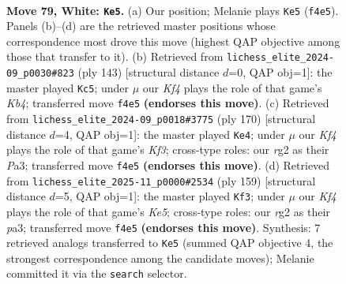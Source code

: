 \documentclass[11pt]{article}
\begin{document}
\clearpage

\begin{figure}[p]\centering
\begin{subfigure}{0.46\textwidth}\centering
\resizebox{\linewidth}{!}{%
\newchessgame
\chessboard[
  setfen={8/4k3/8/2pp4/p4K2/8/6r1/8 w - - 14 79},
  showmover=false,
  pgfstyle=straightmove, color=movearrow, markmove={f4-e5}
]}
\caption{}
\end{subfigure}\hfill
\begin{subfigure}{0.46\textwidth}\centering
\resizebox{\linewidth}{!}{%
\newchessgame
\chessboard[
  setfen={8/5P2/8/1k1P2P1/7R/3K4/8/8 b - - 0 72},
  showmover=false,
  pgfstyle=straightmove, color=movearrow, markmove={b5-c5}
]}
\caption{}
\end{subfigure}
\\[4pt]
\begin{subfigure}{0.46\textwidth}\centering
\resizebox{\linewidth}{!}{%
\newchessgame
\chessboard[
  setfen={8/p7/8/6k1/3p4/P4K2/8/8 w - - 0 86},
  showmover=false,
  pgfstyle=straightmove, color=movearrow, markmove={f3-e4}
]}
\caption{}
\end{subfigure}\hfill
\begin{subfigure}{0.46\textwidth}\centering
\resizebox{\linewidth}{!}{%
\newchessgame
\chessboard[
  setfen={8/8/8/1K6/4k1p1/P5P1/8/8 b - - 2 80},
  showmover=false,
  pgfstyle=straightmove, color=movearrow, markmove={e4-f3}
]}
\caption{}
\end{subfigure}
\caption{\textbf{Move 79, White: \texttt{Ke5}.} (a) Our position; Melanie plays \texttt{Ke5} (\texttt{f4e5}). Panels (b)--(d) are the retrieved master positions whose correspondence most drove this move (highest QAP objective among those that transfer to it). (b) Retrieved from \texttt{lichess\_elite\_2024-09\_p0030\#823} (ply 143) [structural distance $d$=0, QAP obj=1]: the master played \texttt{Kc5}; under $\mu$ our \emph{Kf4} plays the role of that game's \emph{Kb4}; transferred move \texttt{f4e5} \textbf{(endorses this move)}. (c) Retrieved from \texttt{lichess\_elite\_2024-09\_p0018\#3775} (ply 170) [structural distance $d$=4, QAP obj=1]: the master played \texttt{Ke4}; under $\mu$ our \emph{Kf4} plays the role of that game's \emph{Kf3}; cross-type roles: our \emph{r}g2 as their \emph{P}a3; transferred move \texttt{f4e5} \textbf{(endorses this move)}. (d) Retrieved from \texttt{lichess\_elite\_2025-11\_p0000\#2534} (ply 159) [structural distance $d$=5, QAP obj=1]: the master played \texttt{Kf3}; under $\mu$ our \emph{Kf4} plays the role of that game's \emph{Ke5}; cross-type roles: our \emph{r}g2 as their \emph{p}a3; transferred move \texttt{f4e5} \textbf{(endorses this move)}. Synthesis: 7 retrieved analogs transferred to \texttt{Ke5} (summed QAP objective 4, the strongest correspondence among the candidate moves); Melanie committed it via the \texttt{search} selector.}
\label{fig:thought-m156}
\end{figure}
\end{document}
